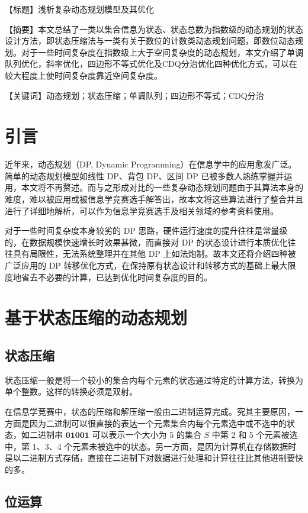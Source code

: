 【标题】浅析复杂动态规划模型及其优化

【摘要】本文总结了一类以集合信息为状态、状态总数为指数级的动态规划的状态设计方法，即状态压缩法与一类有关于数位的计数类动态规划问题，即数位动态规划。对于一些时间复杂度在指数级上大于空间复杂度的动态规划，本文介绍了单调队列优化，斜率优化，四边形不等式优化及CDQ分治优化四种优化方式，可以在较大程度上使时间复杂度靠近空间复杂度。

【关键词】动态规划；状态压缩；单调队列；四边形不等式；CDQ分治

\section{引言}

近年来，动态规划（DP, Dynamic
Programming）在信息学中的应用愈发广泛。简单的动态规划模型如线性 DP、背包
DP、区间 DP
已被多数人熟练掌握并运用，本文将不再赘述。而与之形成对比的一些复杂动态规划问题由于其算法本身的难度，难以被应用或被信息学竞赛选手解答出，故本文将这些算法进行了整合并且进行了详细地解析，可以作为信息学竞赛选手及相关领域的参考资料使用。

对于一些时间复杂度本身较劣的 DP
思路，硬件运行速度的提升往往是常量级的，在数据规模快速增长时效果甚微，而直接对
DP 的状态设计进行本质优化往往具有局限性，无法系统整理并在其他 DP
上如法炮制。故本文还将介绍四种被广泛应用的 DP
转移优化方式，在保持原有状态设计和转移方式的基础上最大限度地省去不必要的计算，已达到优化时间复杂度的目的。

\section{基于状态压缩的动态规划}

\subsection{状态压缩}

状态压缩一般是将一个较小的集合内每个元素的状态通过特定的计算方法，转换为单个整数。这样的转换必须是双射。

在信息学竞赛中，状态的压缩和解压缩一般由二进制运算完成。究其主要原因，一方面是因为二进制可以很直接的表达一个元素集合内每个元素选中或不选中的状态，如二进制串
\(\mathbf{01001}\) 可以表示一个大小为 \(5\) 的集合 \(S\) 中第 \(2\) 和
\(5\) 个元素被选中，第 \(1\)、\(3\)、\(4\)
个元素未被选中的状态。另一方面，是因为计算机在存储数据时是以二进制方式存储，直接在二进制下对数据进行处理和计算往往比其他进制要快的多。

\subsection{位运算}

